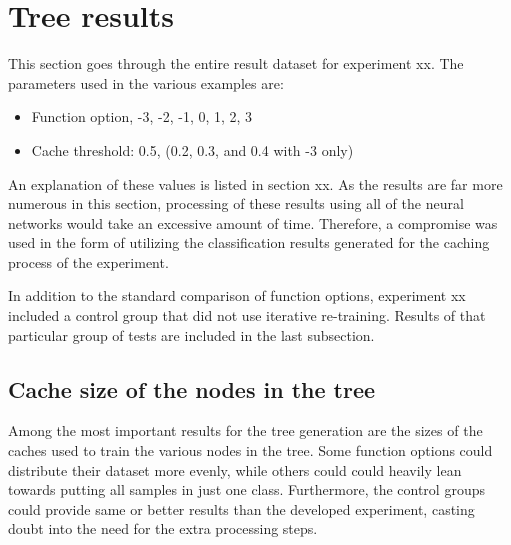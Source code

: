 \section{Tree results}
This section goes through the entire result dataset for experiment xx.
The parameters used in the various examples are:

\begin{itemize}
    \item Function option, -3, -2, -1, 0, 1, 2, 3
    \item Cache threshold: 0.5, (0.2, 0.3, and 0.4 with -3 only)
\end{itemize}{}

An explanation of these values is listed in section xx.
As the results are far more numerous in this section, processing of these results using all of the neural networks would take an excessive amount of time.
Therefore, a compromise was used in the form of utilizing the classification results generated for the caching process of the experiment.

In addition to the standard comparison of function options, experiment xx included a control group that did not use iterative re-training.
Results of that particular group of tests are included in the last subsection.

\subsection{Cache size of the nodes in the tree}
Among the most important results for the tree generation are the sizes of the caches used to train the various nodes in the tree.
Some function options could distribute their dataset more evenly, while others could could heavily lean towards putting all samples in just one class.
Furthermore, the control groups could provide same or better results than the developed experiment, casting doubt into the need for the extra processing steps.

